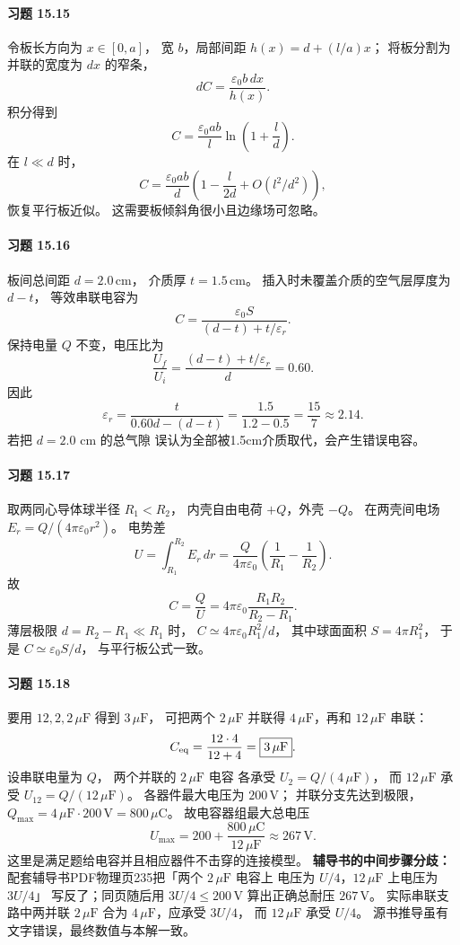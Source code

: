 \paragraph{习题 15.15}
令板长方向为 \(x\in[0,a]\)，
宽 \(b\)，局部间距
\(h(x)=d+(l/a)x\)；
将板分割为并联的宽度为 \(dx\) 的窄条，
\[
 dC=\frac{\varepsilon_0 b\,dx}{h(x)}.
\]
积分得到
\[
 \boxed{C=\frac{\varepsilon_0ab}{l}
 \ln\left(1+\frac ld\right)}.
\]
在 \(l\ll d\) 时，
\[
 C=\frac{\varepsilon_0ab}{d}
 \left(1-\frac l{2d}+O(l^2/d^2)\right),
\]
恢复平行板近似。
这需要板倾斜角很小且边缘场可忽略。


\paragraph{习题 15.16}
板间总间距
\(d=2.0\,\mathrm{cm}\)，
介质厚
\(t=1.5\,\mathrm{cm}\)。
插入时未覆盖介质的空气层厚度为 \(d-t\)，
等效串联电容为
\[
 C=\frac{\varepsilon_0S}{(d-t)+t/\varepsilon_r}.
\]
保持电量 \(Q\) 不变，电压比为
\[
 \frac{U_f}{U_i}=\frac{(d-t)+t/\varepsilon_r}{d}
 =0.60.
\]
因此
\[
 \boxed{\varepsilon_r=
 \frac{t}{0.60d-(d-t)}
 =\frac{1.5}{1.2-0.5}=\frac{15}{7}
 \approx2.14}.
\]
若把 \(d=2.0\) cm 的总气隙
误认为全部被1.5cm介质取代，会产生错误电容。

\paragraph{习题 15.17}
取两同心导体球半径 \(R_1<R_2\)，
内壳自由电荷 \(+Q\)，外壳 \(-Q\)。
在两壳间电场
\(E_r=Q/(4\pi\varepsilon_0r^2)\)。
电势差
\[
 U=\int_{R_1}^{R_2}E_r\,dr
 =\frac{Q}{4\pi\varepsilon_0}
 \left(\frac1{R_1}-\frac1{R_2}\right).
\]
故
\[
 \boxed{C=\frac QU
 =4\pi\varepsilon_0\frac{R_1R_2}{R_2-R_1}}.
\]
薄层极限 \(d=R_2-R_1\ll R_1\) 时，
\(C\simeq4\pi\varepsilon_0R_1^2/d\)，
其中球面面积
\(S=4\pi R_1^2\)，
于是 \(C\simeq\varepsilon_0S/d\)，
与平行板公式一致。

\paragraph{习题 15.18}
要用 \(12,2,2\,\mu\mathrm F\)
得到 \(3\,\mu\mathrm F\)，
可把两个 \(2\,\mu\mathrm F\) 并联得
\(4\,\mu\mathrm F\)，再和
\(12\,\mu\mathrm F\) 串联：
\[
 C_{\rm eq}=\frac{12\cdot4}{12+4}
 =\boxed{3\,\mu\mathrm F}.
\]
设串联电量为 \(Q\)，
两个并联的 \(2\,\mu\mathrm F\) 电容
各承受 \(U_2=Q/(4\,\mu\mathrm F)\)，
而 \(12\,\mu\mathrm F\) 承受
\(U_{12}=Q/(12\,\mu\mathrm F)\)。
各器件最大电压为 \(200\,\mathrm V\)；
并联分支先达到极限，
\(Q_{\max}=4\,\mu\mathrm F\cdot200\,\mathrm V
 =800\,\mu\mathrm C\)。
故电容器组最大总电压
\[
 \boxed{U_{\max}=200+
 \frac{800\,\mu\mathrm C}{12\,\mu\mathrm F}
 \approx267\,\mathrm V}.
\]
这里是满足题给电容并且相应器件不击穿的连接模型。
\textbf{辅导书的中间步骤分歧：}
配套辅导书PDF物理页235把「两个 \(2\,\mu\mathrm F\) 电容上
电压为 \(U/4\)，\(12\,\mu\mathrm F\) 上电压为 \(3U/4\)」
写反了；同页随后用 \(3U/4\le200\,\mathrm V\)
算出正确总耐压 \(267\,\mathrm V\)。
实际串联支路中两并联 \(2\,\mu\mathrm F\)
合为 \(4\,\mu\mathrm F\)，应承受 \(3U/4\)，
而 \(12\,\mu\mathrm F\) 承受 \(U/4\)。
源书推导虽有文字错误，最终数值与本解一致。

